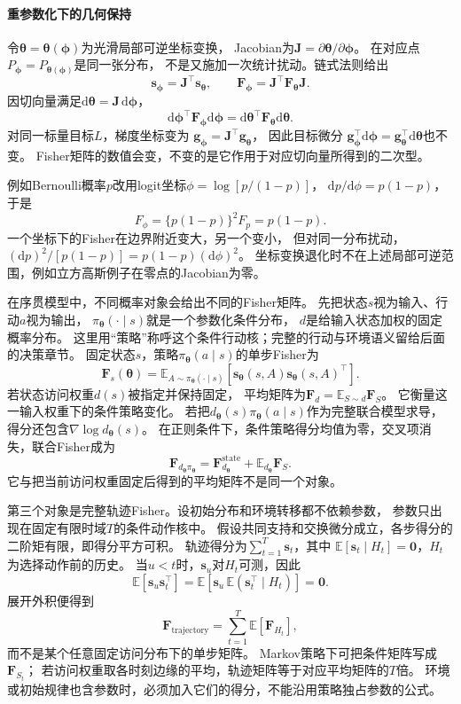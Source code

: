 \paragraph{重参数化下的几何保持}
\label{sec:information-fisher-reparameterization}

令\(\bm\theta=\bm\theta(\bm\phi)\)为光滑局部可逆坐标变换，
Jacobian为\(\bm J=\partial\bm\theta/\partial\bm\phi\)。
在对应点\(P_{\bm\phi}=P_{\bm\theta(\bm\phi)}\)是同一张分布，
不是又施加一次统计扰动。链式法则给出
\[
  \bm s_{\bm\phi}=\bm J^\top\bm s_{\bm\theta},\qquad
  \bm F_{\bm\phi}=\bm J^\top\bm F_{\bm\theta}\bm J.
\]
因切向量满足\(\mathrm d\bm\theta=\bm J\,\mathrm d\bm\phi\)，
\[
  \mathrm d\bm\phi^\top\bm F_{\bm\phi}\mathrm d\bm\phi
  =\mathrm d\bm\theta^\top\bm F_{\bm\theta}\mathrm d\bm\theta.
\]
对同一标量目标\(L\)，梯度坐标变为
\(\bm g_{\bm\phi}=\bm J^\top\bm g_{\bm\theta}\)，
因此目标微分
\(\bm g_{\bm\phi}^\top\mathrm d\bm\phi
=\bm g_{\bm\theta}^\top\mathrm d\bm\theta\)也不变。
Fisher矩阵的数值会变，不变的是它作用于对应切向量所得到的二次型。

例如Bernoulli概率\(p\)改用logit坐标\(\phi=\log[p/(1-p)]\)，
\(\mathrm dp/\mathrm d\phi=p(1-p)\)，于是
\[
  F_\phi=\{p(1-p)\}^2F_p=p(1-p).
\]
一个坐标下的Fisher在边界附近变大，另一个变小，
但对同一分布扰动，
\((\mathrm dp)^2/[p(1-p)]=p(1-p)(\mathrm d\phi)^2\)。
坐标变换退化时不在上述局部可逆范围，例如立方高斯例子在零点的Jacobian为零。

在序贯模型中，不同概率对象会给出不同的Fisher矩阵。
先把状态\(s\)视为输入、行动\(a\)视为输出，
\(\pi_{\bm\theta}(\cdot\mid s)\)就是一个参数化条件分布，
\(d\)是给输入状态加权的固定概率分布。
这里用“策略”称呼这个条件行动核；完整的行动与环境语义留给后面的决策章节。
固定状态\(s\)，策略\(\pi_{\bm\theta}(a\mid s)\)的单步Fisher为
\[
  \bm F_s(\bm\theta)
  =\mathbb E_{A\sim\pi_{\bm\theta}(\cdot\mid s)}
    [\bm s_{\bm\theta}(s,A)\bm s_{\bm\theta}(s,A)^\top].
\]
若状态访问权重\(d(s)\)被指定并保持固定，
平均矩阵为\(\bm F_d=\mathbb E_{S\sim d}\bm F_S\)。
它衡量这一输入权重下的条件策略变化。
若把\(d_{\bm\theta}(s)\pi_{\bm\theta}(a\mid s)\)作为完整联合模型求导，
得分还包含\(\nabla\log d_{\bm\theta}(s)\)。
在正则条件下，条件策略得分均值为零，交叉项消失，联合Fisher成为
\[
  \bm F_{d_{\bm\theta}\pi_{\bm\theta}}
  =\bm F_{d_{\bm\theta}}^{\mathrm{state}}
    +\mathbb E_{d_{\bm\theta}}\bm F_S.
\]
它与把当前访问权重固定后得到的平均矩阵不是同一个对象。

第三个对象是完整轨迹Fisher。设初始分布和环境转移都不依赖参数，
参数只出现在固定有限时域\(T\)的条件动作核中。
假设共同支持和交换微分成立，各步得分的二阶矩有限，即得分平方可积。
轨迹得分为\(\sum_{t=1}^T\bm s_t\)，其中
\(\mathbb E[\bm s_t\mid H_t]=\bm0\)，\(H_t\)为选择动作前的历史。
当\(u<t\)时，\(\bm s_u\)对\(H_t\)可测，因此
\[
  \mathbb E[\bm s_u\bm s_t^\top]
  =\mathbb E[\bm s_u\,\mathbb E(\bm s_t^\top\mid H_t)]=\bm0.
\]
展开外积便得到
\[
  \bm F_{\mathrm{trajectory}}
  =\sum_{t=1}^T\mathbb E[\bm F_{H_t}],
\]
而不是某个任意固定访问分布下的单步矩阵。
Markov策略下可把条件矩阵写成\(\bm F_{S_t}\)；
若访问权重取各时刻边缘的平均，轨迹矩阵等于对应平均矩阵的\(T\)倍。
环境或初始规律也含参数时，必须加入它们的得分，不能沿用策略独占参数的公式。

